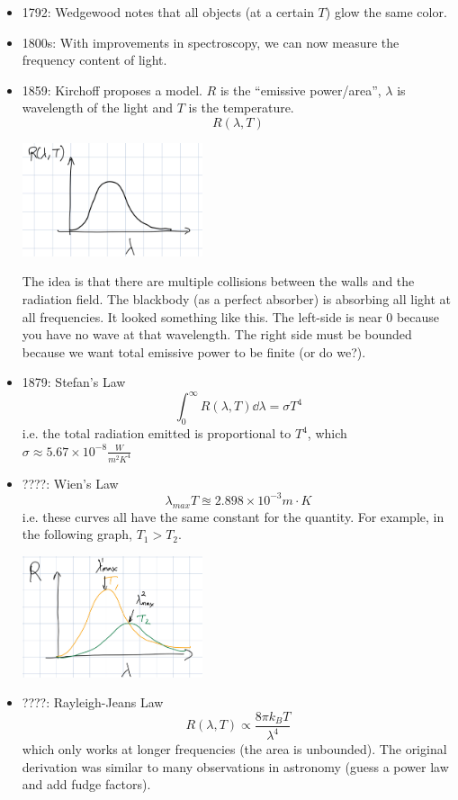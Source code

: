 \begin{itemize}
    \item 1792: Wedgewood notes that all objects (at a certain $T$) glow the same color.
    \item 1800s: With improvements in spectroscopy, we can now measure the frequency content of light.
    \item 1859: Kirchoff proposes a model. $R$ is the ``emissive power/area'', $\lambda$ is wavelength of the light and $T$ is the temperature.
    \[ R(\lambda, T) \]
    \begin{center}
    \includegraphics[width=200px]{../images/Kirchoff_model.jpeg}
    \end{center}
    The idea is that there are multiple collisions between the walls and the radiation field. The blackbody (as a perfect absorber) is absorbing all light at all frequencies.
    It looked something like this. The left-side is near 0 because you have no wave at that wavelength. The right side must be bounded because we want total emissive power to be finite (or do we?).
    \item 1879: Stefan's Law
    \[ \int_{0}^{\infty} R(\lambda, T) \dd{\lambda} = \sigma T^4 \]
    i.e. the total radiation emitted is proportional to $T^4$, which $\sigma \approx 5.67 \times 10^{-8} \frac{W}{m^2 K^4}$ 
    \item ????: Wien's Law
    \[ \lambda_{max} T \approxeq 2.898 \times 10^{-3} m \cdot K\]
    i.e. these curves all have the same constant for the quantity. For example, in the following graph, $T_1 > T_2$.
    \begin{center}
        \includegraphics[width=200px]{../images/Wiens_law.jpeg}
    \end{center}
    \item ????: Rayleigh-Jeans Law
    \[ R(\lambda, T) \propto \frac{8 \pi k_B T}{\lambda^4} \]
    which only works at longer frequencies (the area is unbounded). The original derivation was similar to many observations in astronomy (guess a power law and add fudge factors).
\end{itemize}

